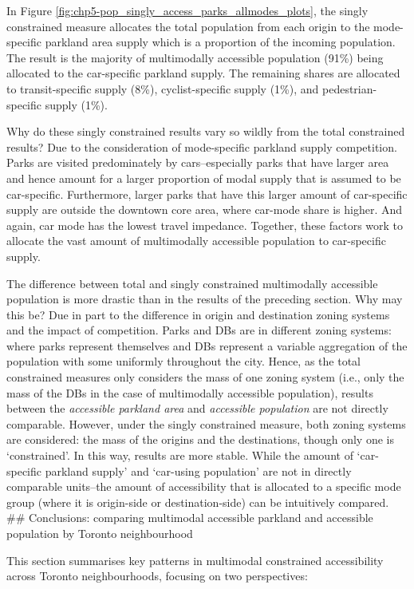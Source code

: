 \documentclass[
11pt, %
oneside, %
english, %
singlespacing, %
]{macthesis} %
\begin{document}
In Figure \ref{fig:chp5-pop_singly_access_parks_allmodes_plots}, the singly constrained measure allocates the total population from each origin to the mode-specific parkland area supply which is a proportion of the incoming population. The result is the majority of multimodally accessible population (91\%) being allocated to the car-specific parkland supply. The remaining shares are allocated to transit-specific supply (8\%), cyclist-specific supply (1\%), and pedestrian-specific supply (1\%).

Why do these singly constrained results vary so wildly from the total constrained results? Due to the consideration of mode-specific parkland supply competition. Parks are visited predominately by cars--especially parks that have larger area and hence amount for a larger proportion of modal supply that is assumed to be car-specific. Furthermore, larger parks that have this larger amount of car-specific supply are outside the downtown core area, where car-mode share is higher. And again, car mode has the lowest travel impedance. Together, these factors work to allocate the vast amount of multimodally accessible population to car-specific supply.

The difference between total and singly constrained multimodally accessible population is more drastic than in the results of the preceding section. Why may this be? Due in part to the difference in origin and destination zoning systems and the impact of competition. Parks and DBs are in different zoning systems: where parks represent themselves and DBs represent a variable aggregation of the population with some uniformly throughout the city. Hence, as the total constrained measures only considers the mass of one zoning system (i.e., only the mass of the DBs in the case of multimodally accessible population), results between the \emph{accessible parkland area} and \emph{accessible population} are not directly comparable. However, under the singly constrained measure, both zoning systems are considered: the mass of the origins and the destinations, though only one is `constrained'. In this way, results are more stable. While the amount of `car-specific parkland supply' and `car-using population' are not in directly comparable units--the amount of accessibility that is allocated to a specific mode group (where it is origin-side or destination-side) can be intuitively compared.
\#\# Conclusions: comparing multimodal accessible parkland and accessible population by Toronto neighbourhood

This section summarises key patterns in multimodal constrained accessibility across Toronto neighbourhoods, focusing on two perspectives:
\end{document}

